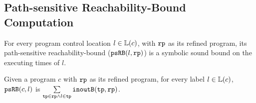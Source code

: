 \subsection{Path-sensitive Reachability-Bound Computation}

For every program control location $l \in \mathbb{L}(c)$, with $\mathtt{rp}$ as its refined program,
its path-sensitive reachability-bound ($\mathtt{psRB}(l, \mathtt{rp})$) is a symbolic sound bound on the executing times of $l$.
 \begin{defn}
  \label{def:label_psrb}
  Given a program $c$ with $\mathtt{rp}$ as its refined program,
  for every label $l \in \mathbb{L}(c)$, $\mathtt{psRB}(c, l)$ is $\sum\limits_{\mathtt{tp} \in \mathtt{rp} \land 
  l \in \mathtt{tp}} \mathtt{inoutB}(\mathtt{tp}, \mathtt{rp})$.
 \end{defn}